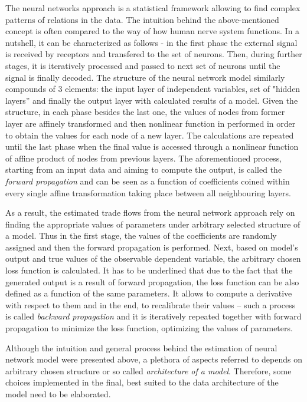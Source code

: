\documentclass{Trade_template}
\numberwithin{equation}{section}
\begin{document}
The neural networks approach is a statistical framework allowing to find complex patterns of relations in the data. The intuition behind the above-mentioned concept is often compared to the way of how human nerve system functions. In a nutshell, it can be characterized as follows - in the first phase the external signal is received by receptors and transfered to the set of neurons. Then, during further stages, it is iteratively processed and passed to next set of neurons until the signal is finally decoded. The structure of the neural network model similarly compounds of 3 elements: the input layer of independent variables, set of "hidden layers” and finally the output layer with calculated results of a model. Given the structure, in each phase besides the last one, the values of nodes from former layer are affinely transformed and then nonlinear function in performed in order to obtain the values for each node of a new layer. The calculations are repeated until the last phase when the final value is accessed through a nonlinear function of affine product of nodes from previous layers. The aforementioned process, starting from an input data and aiming to compute the output, is called the \textit{forward propagation} and can be seen as a function of coefficients coined within every single affine transformation taking place between all neighbouring layers.

As a result, the estimated trade flows from the neural network approach rely on finding the appropriate values of parameters under arbitrary selected structure of a model. Thus in the first stage, the values of the coefficients are randomly assigned and then the forward propagation is performed. Next, based on model’s output and true values of the observable dependent variable, the arbitrary chosen loss function is calculated. It has to be underlined that due to the fact that the generated output is a result of forward propagation, the loss function can be also defined as a function of the same parameters. It allows to compute a derivative with respect to them and in the end, to recalibrate their values – such a process is called  \textit{backward propagation} and it is iteratively repeated together with forward propagation to minimize the loss function, optimizing the values of parameters. 

Although the intuition and general process behind the estimation of neural network model were presented above, a plethora of aspects referred to depends on arbitrary chosen structure or so called \textit{architecture of a model}. Therefore, some choices implemented in the final, best suited to the data architecture of the model need to be elaborated.
\end{document}
